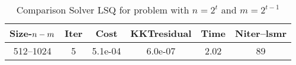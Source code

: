 \documentclass[letterpaper,12pt,oneside,final]{book}
\begin{document}
\begin{table}
\caption{ Comparison Solver LSQ  for  problem with $n=2^{t}$ and $m=2^{t-1}$  } 
\begin{center}
\begin{tabular}{|*{6}{c}|} \hline
Size-$n\--m$ & \multicolumn{1}{c}{Iter} & \multicolumn{1}{c}{Cost}& \multicolumn{1}{c}{KKTresidual} & \multicolumn{1}{c}{Time} & \multicolumn{1}{c|}{Niter--lsmr} \\ 
\hline

512--1024      &5    &5.1e-04        &6.0e-07        &2.02           &89   \\ 

\hline
\end{tabular}
\end{center}
\end{table}
\end{document}
